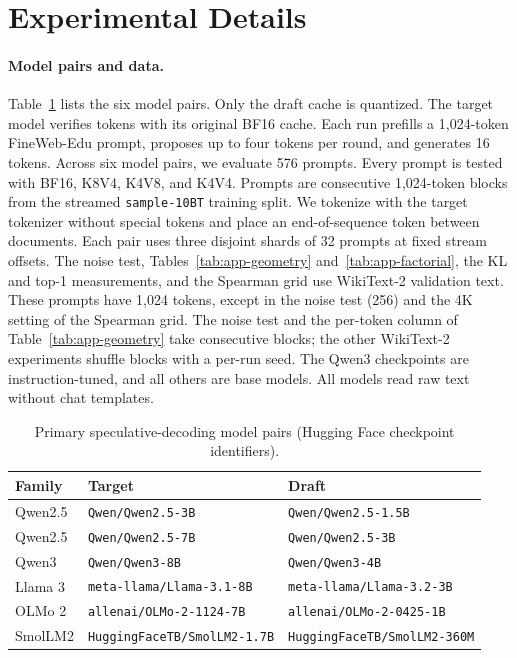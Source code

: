 \documentclass{article}
\begin{document}
\clearpage



\clearpage
\appendix

\section{Experimental Details}
\label{app:protocol}

\paragraph{Model pairs and data.}
Table~\ref{tab:app-models} lists the six model pairs. Only the draft cache is
quantized. The target model verifies tokens with its original BF16 cache. Each
run prefills a 1,024-token FineWeb-Edu prompt, proposes up to four tokens per
round, and generates 16 tokens. Across six model pairs, we evaluate 576 prompts.
Every prompt is tested with BF16, K8V4, K4V8, and K4V4.
Prompts are consecutive 1,024-token blocks from the streamed
\texttt{sample-10BT} training split. We tokenize with the target tokenizer
without special tokens and place an end-of-sequence token between documents.
Each pair uses three disjoint shards of 32 prompts at fixed stream offsets. The
noise test, Tables~\ref{tab:app-geometry} and~\ref{tab:app-factorial}, the KL and
top-1 measurements, and the Spearman grid use WikiText-2 validation text.
These prompts have 1,024 tokens, except in the noise test (256) and the 4K
setting of the Spearman grid. The noise test and the per-token column of
Table~\ref{tab:app-geometry} take consecutive blocks; the other WikiText-2
experiments shuffle blocks with a per-run seed. The
Qwen3 checkpoints are instruction-tuned, and all others are base models. All
models read raw text without chat templates.

\begin{table}[ht]
  \centering
  \small
  \caption{Primary speculative-decoding model pairs (Hugging Face checkpoint
  identifiers).}
  \label{tab:app-models}
  \begin{tabular}{lll}
    \toprule
    Family & Target & Draft \\
    \midrule
    Qwen2.5 & \texttt{Qwen/Qwen2.5-3B} & \texttt{Qwen/Qwen2.5-1.5B} \\
    Qwen2.5 & \texttt{Qwen/Qwen2.5-7B} & \texttt{Qwen/Qwen2.5-3B} \\
    Qwen3 & \texttt{Qwen/Qwen3-8B} & \texttt{Qwen/Qwen3-4B} \\
    Llama 3 & \texttt{meta-llama/Llama-3.1-8B} & \texttt{meta-llama/Llama-3.2-3B} \\
    OLMo 2 & \texttt{allenai/OLMo-2-1124-7B} & \texttt{allenai/OLMo-2-0425-1B} \\
    SmolLM2 & \texttt{HuggingFaceTB/SmolLM2-1.7B} & \texttt{HuggingFaceTB/SmolLM2-360M} \\
    \bottomrule
  \end{tabular}
\end{table}
\end{document}
